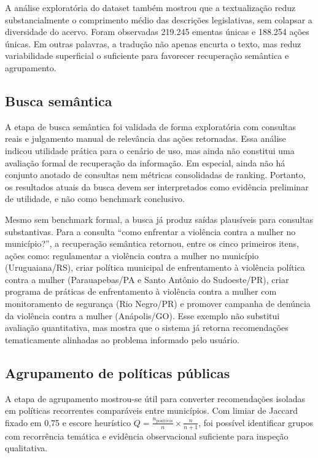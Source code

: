 A análise exploratória do dataset também mostrou que a textualização reduz substancialmente o comprimento médio das descrições legislativas, sem colapsar a diversidade do acervo. Foram observadas 219.245 ementas únicas e 188.254 ações únicas. Em outras palavras, a tradução não apenas encurta o texto, mas reduz variabilidade superficial o suficiente para favorecer recuperação semântica e agrupamento.

\subsection{Busca semântica}

A etapa de busca semântica foi validada de forma exploratória com consultas reais e julgamento manual de relevância das ações retornadas. Essa análise indicou utilidade prática para o cenário de uso, mas ainda não constitui uma avaliação formal de recuperação da informação. Em especial, ainda não há conjunto anotado de consultas nem métricas consolidadas de ranking. Portanto, os resultados atuais da busca devem ser interpretados como evidência preliminar de utilidade, e não como benchmark conclusivo.

Mesmo sem benchmark formal, a busca já produz saídas plausíveis para consultas substantivas. Para a consulta ``como enfrentar a violência contra a mulher no município?'', a recuperação semântica retornou, entre os cinco primeiros itens, ações como: regulamentar a violência contra a mulher no município (Uruguaiana/RS), criar política municipal de enfrentamento à violência política contra a mulher (Parauapebas/PA e Santo Antônio do Sudoeste/PR), criar programa de práticas de enfrentamento à violência contra a mulher com monitoramento de segurança (Rio Negro/PR) e promover campanha de denúncia da violência contra a mulher (Anápolis/GO). Esse exemplo não substitui avaliação quantitativa, mas mostra que o sistema já retorna recomendações tematicamente alinhadas ao problema informado pelo usuário.

\subsection{Agrupamento de políticas públicas}

A etapa de agrupamento mostrou-se útil para converter recomendações isoladas em políticas recorrentes comparáveis entre municípios. Com limiar de Jaccard fixado em 0,75 e escore heurístico $Q = \frac{n_{\text{positivos}}}{n}\times\frac{n}{n+1}$, foi possível identificar grupos com recorrência temática e evidência observacional suficiente para inspeção qualitativa.

